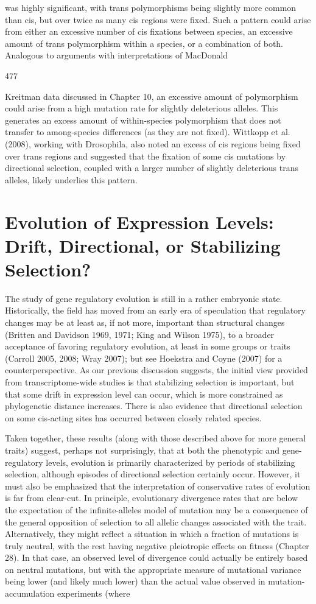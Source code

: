 \documentclass{article}
\begin{document}
was highly significant, with trans polymorphisms being slightly more common than cis, but over twice as many cis regions were fixed. Such a pattern could arise from either an excessive number of cis fixations between species, an excessive amount of trans polymorphism within a species, or a combination of both. Analogous to arguments with interpretations of MacDonald

477

Kreitman data discussed in Chapter 10, an excessive amount of polymorphism could arise from a high mutation rate for slightly deleterious alleles. This generates an excess amount of within-species polymorphism that does not transfer to among-species differences (as they are not fixed). Wittkopp et al. (2008), working with Drosophila, also noted an excess of cis regions being fixed over trans regions and suggested that the fixation of some cis mutations by directional selection, coupled with a larger number of slightly deleterious trans alleles, likely underlies this pattern.

\section{Evolution of Expression Levels: Drift, Directional, or Stabilizing Selection?}
The study of gene regulatory evolution is still in a rather embryonic state. Historically, the field has moved from an early era of speculation that regulatory changes may be at least as, if not more, important than structural changes (Britten and Davidson 1969, 1971; King and Wilson 1975), to a broader acceptance of favoring regulatory evolution, at least in some groups or traits (Carroll 2005, 2008; Wray 2007); but see Hoekstra and Coyne (2007) for a counterperspective. As our previous discussion suggests, the initial view provided from transcriptome-wide studies is that stabilizing selection is important, but that some drift in expression level can occur, which is more constrained as phylogenetic distance increases. There is also evidence that directional selection on some cis-acting sites has occurred between closely related species.

Taken together, these results (along with those described above for more general traits) suggest, perhaps not surprisingly, that at both the phenotypic and gene-regulatory levels, evolution is primarily characterized by periods of stabilizing selection, although episodes of directional selection certainly occur. However, it must also be emphasized that the interpretation of conservative rates of evolution is far from clear-cut. In principle, evolutionary divergence rates that are below the expectation of the infinite-alleles model of mutation may be a consequence of the general opposition of selection to all allelic changes associated with the trait. Alternatively, they might reflect a situation in which a fraction of mutations is truly neutral, with the rest having negative pleiotropic effects on fitness (Chapter 28). In that case, an observed level of divergence could actually be entirely based on neutral mutations, but with the appropriate measure of mutational variance being lower (and likely much lower) than the actual value observed in mutation-accumulation experiments (where
\end{document}
